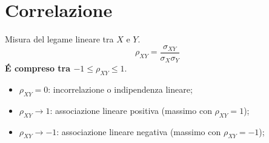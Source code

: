 \section{Correlazione}
Misura del legame lineare tra $X$ e $Y$.
\[ \rho_{XY} = \frac{\sigma_{XY}}{\sigma_X \sigma_Y}\]
\textbf{\'E compreso tra $-1 \le \rho_{XY} \le 1$}.
\begin{itemize}
 \item $\rho_{XY} = 0$: incorrelazione o indipendenza lineare;
 \item $\rho_{XY} \rightarrow 1$: associazione lineare positiva (massimo 
con $\rho_{XY} = 1$);
\item $\rho_{XY} \rightarrow -1$: associazione lineare negativa (massimo 
con $\rho_{XY} = -1$);
\end{itemize}
